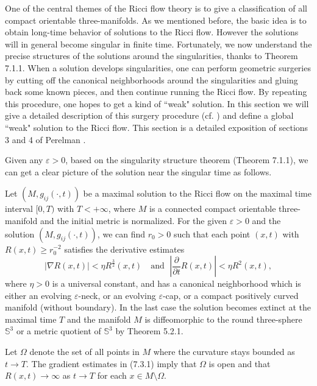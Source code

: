 One of the central themes of the Ricci flow theory is to give a
classification of all compact orientable three-manifolds. As we
mentioned before, the basic idea is to obtain long-time behavior
of solutions to the Ricci flow. However the solutions will in
general become singular in finite time. Fortunately, we now
understand the precise structures of the solutions around the
singularities, thanks to Theorem 7.1.1. When a solution develops
singularities, one can perform geometric surgeries by cutting off
the canonical neighborhoods around the singularities and gluing
back some known pieces, and then continue running the Ricci flow.
By repeating this procedure, one hopes to get a kind of ``weak"
solution. In this section we will give a detailed description of
this surgery procedure (cf. \cite{Ha97, P2}) and define a global
``weak" solution to the Ricci flow. This section is a detailed
exposition of sections 3 and 4 of Perelman \cite{P2}.

Given any $\varepsilon>0$, based on the singularity structure
theorem (Theorem 7.1.1), we can get a clear picture of the
solution near the singular time as follows.

Let $(M,g_{ij}(\cdot,t))$ be a maximal solution to the Ricci flow
on the maximal time interval $[0,T)$ with $T<+\infty$, where $M$
is a connected compact orientable three-manifold and the initial
metric is normalized. For the given $\varepsilon>0$ and the
solution $(M,g_{ij}(\cdot,t))$, we can find $r_0>0$ such that each
point $(x,t)$ with $R(x,t)\ge r_0^{-2}$ satisfies the derivative
estimates \begin{equation} |\nabla R(x,t)|<\eta R^{\frac{3}{2}}(x,t)\quad
\mbox{and }\; \left|\frac{\partial}{\partial t}R(x,t)\right|<\eta
R^2(x,t),
\end{equation} where $\eta>0$ is a universal constant, and has a canonical
neighborhood which is either an evolving $\varepsilon$-neck, or an
evolving $\varepsilon$-cap, or a compact positively curved
manifold (without boundary). In the last case the solution becomes
extinct at the maximal time $T$ and the manifold $M$ is
diffeomorphic to the round three-sphere $\mathbb{S}^3$ or a metric
quotient of $\mathbb{S}^3$ by Theorem 5.2.1.

Let $\Omega$ denote the set of all points in $M$ where the
curvature stays bounded as $t\rightarrow T$. The gradient
estimates in (7.3.1) imply that $\Omega$ is open and that
$R(x,t)\rightarrow\infty$ as $t\rightarrow T$ for each $x\in
M\setminus \Omega$.

